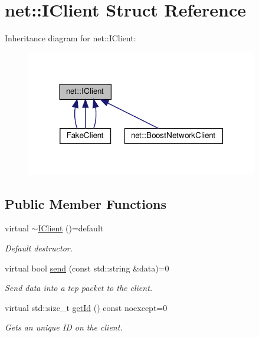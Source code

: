 \hypertarget{structnet_1_1IClient}{}\section{net\+:\+:I\+Client Struct Reference}
\label{structnet_1_1IClient}


Inheritance diagram for net\+:\+:I\+Client\+:
\nopagebreak
\begin{figure}[H]
\begin{center}
\leavevmode
\includegraphics[width=287pt]{structnet_1_1IClient__inherit__graph}
\end{center}
\end{figure}
\subsection*{Public Member Functions}
\begin{DoxyCompactItemize}
\item 
\mbox{\label{structnet_1_1IClient_a0af7b8c2c794bb59fb469805e6fe9782}} 
virtual \hyperlink{structnet_1_1IClient_a0af7b8c2c794bb59fb469805e6fe9782}{$\sim$\+I\+Client} ()=default
\begin{DoxyCompactList}\small\item\em Default destructor. \end{DoxyCompactList}\item 
virtual bool \hyperlink{structnet_1_1IClient_a44691ffe41185a41b5637d7c0068b5f2}{send} (const std\+::string \&data)=0
\begin{DoxyCompactList}\small\item\em Send \textquotesingle{}data\textquotesingle{} into a tcp packet to the client. \end{DoxyCompactList}\item 
\mbox{\label{structnet_1_1IClient_a3233d8ad9276c621e3545c8afce8be42}} 
virtual std\+::size\+\_\+t \hyperlink{structnet_1_1IClient_a3233d8ad9276c621e3545c8afce8be42}{get\+Id} () const noexcept=0
\begin{DoxyCompactList}\small\item\em Gets an unique ID on the client. \end{DoxyCompactList}\end{DoxyCompactItemize}


